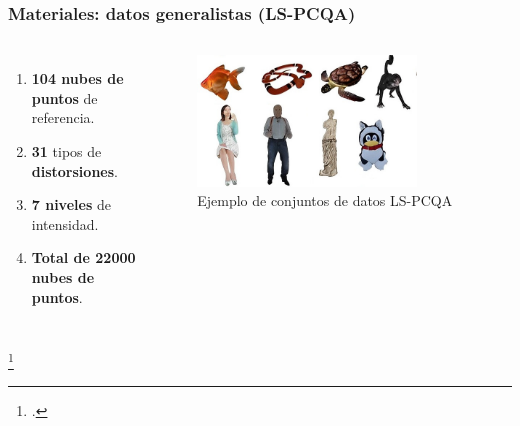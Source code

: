 \begin{frame}
  \frametitle{Materiales: datos generalistas (LS-PCQA)}
  \begin{columns}
    \begin{enumerate}
      \item \textbf{104 nubes de puntos} de referencia.  
      \item \textbf{31} tipos de \textbf{distorsiones}.
      \item \textbf{7 niveles} de intensidad.
      \item \textbf{Total de 22000 nubes de puntos}.
    \end{enumerate}
    \begin{figure}
      \includegraphics[width=0.8\textwidth]{imagenes/chapter3/LSPCQA}
      \caption{Ejemplo de conjuntos de datos LS-PCQA\footnotemark}
      \label{fig:LSSJTU}
    \end{figure}
  \end{columns}
  \footcitetext{ResSCNN}
\end{frame}

